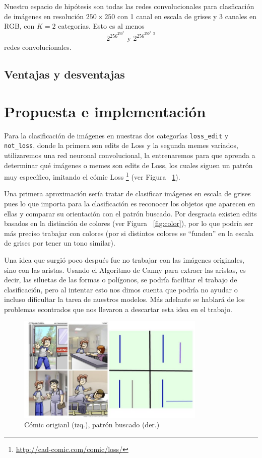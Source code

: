 \documentclass[spanish,11pt,letterpaper]{article}
\begin{document}
Nuestro espacio de hipótesis son todas las redes convolucionales para clasficación
de imágenes en resolución $250 \times 250$ con 1 canal en escala de grises y 3
canales en RGB, con $K = 2$ categorías. Esto es al menos
\[ 2^{256^{250^2}} \text{  y  } 2^{256^{250^2 \cdot 3}}\]
redes convolucionales.

\subsection{Ventajas y desventajas}


\section{Propuesta e implementación}

Para la clasificación de imágenes en nuestras dos categorías \texttt{loss\_edit}
y \texttt{not\_loss}, donde la primera son edits de Loss y la segunda memes
variados, utilizaremos una red neuronal convolucional, la entrenaremos para que
aprenda a determinar qué imágenes o memes son edits de Loss, los cuales siguen
un patrón muy específico, imitando el cómic Loss%
\footnote{\url{http://cad-comic.com/comic/loss/}} (ver Figura ~\ref{fig:loss}).

Una primera aproximación sería tratar de clasificar imágenes en escala de grises
pues lo que importa para la clasificación es reconocer los objetos que aparecen
en ellas y comparar su orientación con el patrón buscado. Por desgracia existen
edits basados en la distinción de colores (ver Figura ~\ref{fig:color}), por lo
que podría ser más preciso trabajar con colores (por si distintos colores se
``funden'' en la escala de grises por tener un tono similar).

Una idea que surgió poco después fue no trabajar con las imágenes originales, sino
con las aristas. Usando el Algoritmo de Canny para extraer las aristas, es decir,
las siluetas de las formas o polígonos, se podría facilitar el trabajo de
clasificación, pero al intentar esto nos dimos cuenta que podría no ayudar o
incluso dificultar la tarea de nuestros modelos. Más adelante se hablará de los problemas
econtrados que nos llevaron a descartar esta idea en el trabajo.

\begin{figure}[h]
\centering
\includegraphics[width=0.8\textwidth]{lossminimal}
\caption{Cómic origianl (izq.), patrón buscado (der.)}
\label{fig:loss}
\end{figure}
\end{document}

